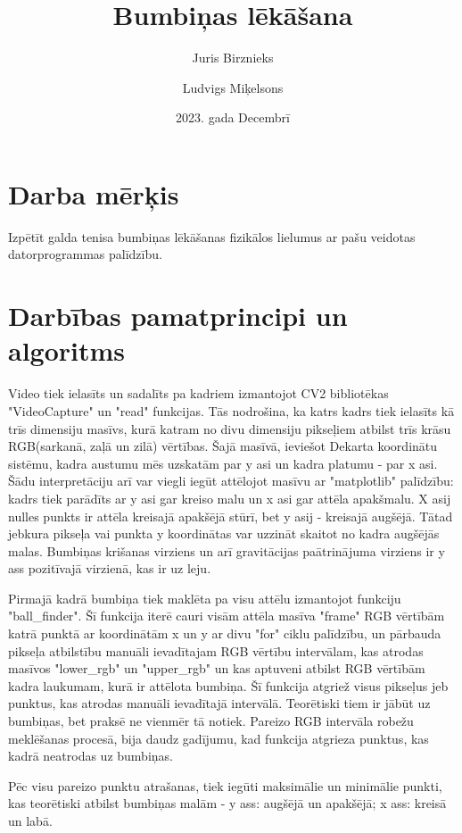 \documentclass{article}
\title{\textbf{Bumbiņas lēkāšana}}
\author{
Juris Birznieks
\and
Ludvigs Miķelsons
}
\date{2023. gada Decembrī}
\begin{document}
\maketitle

\section{Darba mērķis}
Izpētīt galda tenisa bumbiņas lēkāšanas fizikālos lielumus ar pašu veidotas datorprogrammas palīdzību.

\section{Darbības pamatprincipi un algoritms}
Video tiek ielasīts un sadalīts pa kadriem izmantojot CV2 bibliotēkas "VideoCapture" un "read" funkcijas. Tās nodrošina, ka katrs kadrs tiek ielasīts kā trīs dimensiju masīvs, kurā katram no divu dimensiju pikseļiem atbilst trīs krāsu RGB(sarkanā, zaļā un zilā) vērtības. Šajā masīvā, ieviešot Dekarta koordinātu sistēmu, kadra austumu mēs uzskatām par y asi un kadra platumu - par x asi. Šādu interpretāciju arī var viegli iegūt attēlojot masīvu ar "matplotlib" palīdzību: kadrs tiek parādīts ar y asi gar kreiso malu un x asi gar attēla apakšmalu. X asij nulles punkts ir attēla kreisajā apakšējā stūrī, bet y asij - kreisajā augšējā. Tātad jebkura pikseļa vai punkta y koordinātas var uzzināt skaitot no kadra augšējās malas. Bumbiņas krišanas virziens un arī gravitācijas paātrinājuma virziens ir y ass pozitīvajā virzienā, kas ir uz leju.

Pirmajā kadrā bumbiņa tiek maklēta pa visu attēlu izmantojot funkciju "ball_finder". Šī funkcija iterē cauri visām attēla masīva "frame" RGB vērtībām katrā punktā ar koordinātām x un y ar divu "for" ciklu palīdzību,   un pārbauda pikseļa atbilstību manuāli ievadītajam RGB vērtību intervālam, kas atrodas masīvos "lower_rgb" un "upper_rgb" un kas aptuveni atbilst RGB vērtībām kadra laukumam, kurā ir attēlota bumbiņa. Šī funkcija atgriež visus pikseļus jeb punktus, kas atrodas manuāli ievadītajā intervālā. Teorētiski tiem ir jābūt uz bumbiņas, bet praksē ne vienmēr tā notiek. Pareizo RGB intervāla robežu meklēšanas procesā, bija daudz gadījumu, kad funkcija atgrieza punktus, kas kadrā neatrodas uz bumbiņas.

Pēc visu pareizo punktu atrašanas, tiek iegūti maksimālie un minimālie punkti, kas teorētiski atbilst bumbiņas malām - y ass: augšējā un apakšējā; x ass: kreisā un labā. 
\end{document}
